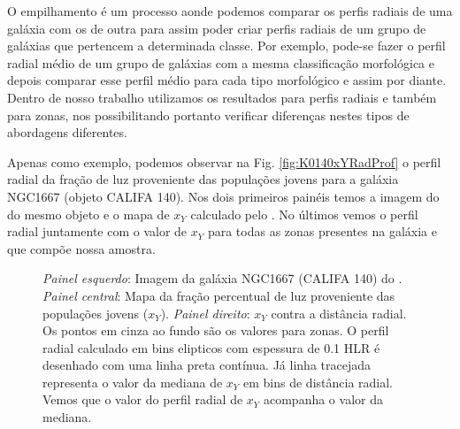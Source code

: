 O empilhamento é um processo aonde podemos comparar os perfis radiais de uma galáxia com os de outra
para assim poder criar perfis radiais de um grupo de galáxias que pertencem a determinada classe.
Por exemplo, pode-se fazer o perfil radial médio de um grupo de galáxias com a mesma classificação
morfológica e depois comparar esse perfil médio para cada tipo morfológico e assim por diante.
Dentro de nosso trabalho utilizamos os resultados para perfis radiais e também para zonas, nos
possibilitando portanto verificar diferenças nestes tipos de abordagens diferentes.

Apenas como exemplo, podemos observar na Fig. \ref{fig:K0140xYRadProf} o perfil radial da fração de
luz proveniente das populações jovens para a galáxia NGC1667 (objeto CALIFA 140). Nos dois primeiros
painéis temos a imagem do \SDSS do mesmo objeto e o mapa de $x_Y$ calculado pelo \starlight. No
últimos vemos o perfil radial juntamente com o valor de $x_Y$ para todas as zonas presentes na
galáxia e que compõe nossa amostra.

\begin{figure}
	\centering
	\caption[Imagem e perfil radial de $x_Y$.]
	{\emph{Painel esquerdo}: Imagem da galáxia NGC1667 (CALIFA 140) do \SDSS. \emph{Painel central}:
	Mapa da fração percentual de luz proveniente das populações jovens ($x_Y$). \emph{Painel direito}:
	$x_Y$ contra a distância radial. Os pontos em cinza ao fundo são os valores para zonas. O perfil radial
	calculado em bins elipticos com espessura de 0.1 HLR é desenhado com uma linha preta contínua. Já
	linha tracejada representa o valor da mediana de $x_Y$ em bins de distância radial. Vemos que o
	valor do perfil radial de $x_Y$ acompanha o valor da mediana. }
	\label{fig:amostraRealMorf}
\end{figure}
 

